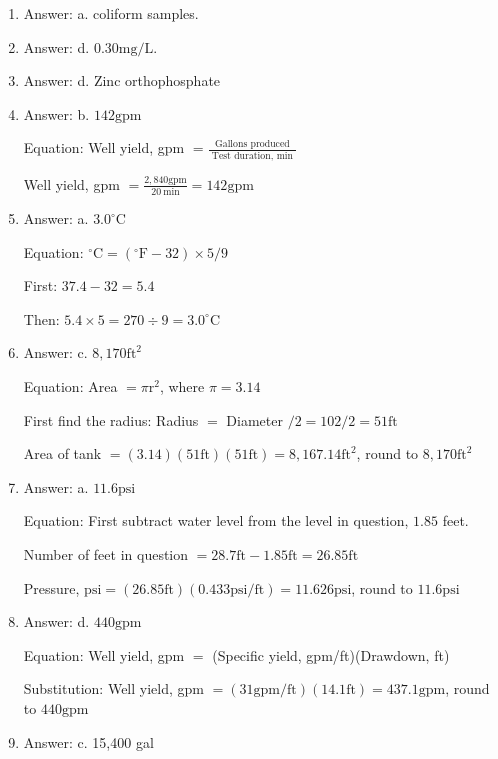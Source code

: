 \documentclass[10pt]{article}
\begin{document}
\begin{enumerate}
  \item Answer: a. coliform samples.

  \item Answer: d. $0.30 \mathrm{mg} / \mathrm{L}$.

  \item Answer: d. Zinc orthophosphate
  
  \item Answer: b. $142 \mathrm{gpm}$

Equation: Well yield, gpm $=\frac{\text { Gallons produced }}{\text { Test duration, min }}$

Well yield, gpm $=\frac{2,840 \mathrm{gpm}}{20 \mathrm{~min}}=142 \mathrm{gpm}$

  \item Answer: a. $3.0^{\circ} \mathrm{C}$

Equation: ${ }^{\circ} \mathrm{C}=\left({ }^{\circ} \mathrm{F}-32\right) \times 5 / 9$

First: $37.4-32=5.4$

Then: $5.4 \times 5=270 \div 9=3.0^{\circ} \mathrm{C}$

  \item Answer: c. $8,170 \mathrm{ft}^{2}$

Equation: Area $=\pi \mathrm{r}^{2}$, where $\pi=3.14$

First find the radius: Radius $=$ Diameter $/ 2=102 / 2=51 \mathrm{ft}$

Area of tank $=(3.14)(51 \mathrm{ft})(51 \mathrm{ft})=8,167.14 \mathrm{ft}^{2}$, round to $8,170 \mathrm{ft}^{2}$

  \item Answer: a. $11.6 \mathrm{psi}$

Equation: First subtract water level from the level in question, $1.85$ feet.

Number of feet in question $=28.7 \mathrm{ft}-1.85 \mathrm{ft}=26.85 \mathrm{ft}$

Pressure, $\mathrm{psi}=(26.85 \mathrm{ft})(0.433 \mathrm{psi} / \mathrm{ft})=11.626 \mathrm{psi}$, round to $11.6 \mathrm{psi}$

  \item Answer: d. $440 \mathrm{gpm}$

Equation: Well yield, gpm $=$ (Specific yield, gpm/ft)(Drawdown, ft)

Substitution: Well yield, gpm $=(31 \mathrm{gpm} / \mathrm{ft})(14.1 \mathrm{ft})=437.1 \mathrm{gpm}$, round to $440 \mathrm{gpm}$

  \item Answer: c. 15,400 gal


\end{enumerate}
\end{document}
